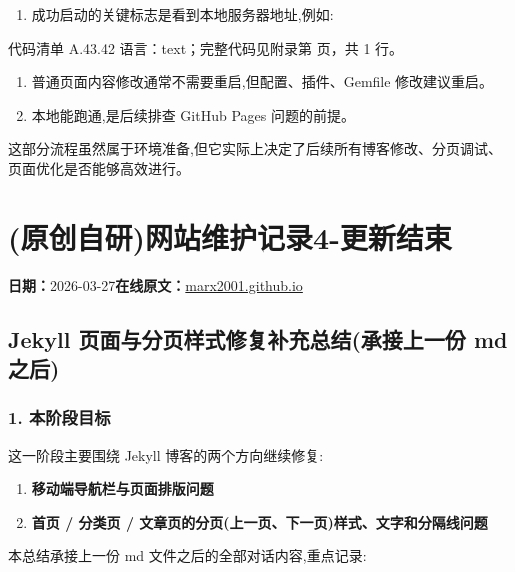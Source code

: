 \documentclass[lang=cn,scheme=chinese,color=blue,device=normal,toc=onecol,math=cm]{elegantbook}
\begin{document}
\begin{enumerate}
\item 成功启动的关键标志是看到本地服务器地址,例如:
\end{enumerate}


\begin{codeindexbox}{代码清单 A.43.42}
语言：text；完整代码见附录第 \pageref{code:43:42} 页，共 1 行。
\end{codeindexbox}


\begin{enumerate}
\item 普通页面内容修改通常不需要重启,但配置、插件、Gemfile 修改建议重启。
\item 本地能跑通,是后续排查 GitHub Pages 问题的前提。
\end{enumerate}


这部分流程虽然属于环境准备,但它实际上决定了后续所有博客修改、分页调试、页面优化是否能够高效进行。\par



\section{(原创自研)网站维护记录4-更新结束}
\begin{articlemeta}
\textbf{日期：}2026-03-27\hfill\textbf{在线原文：}\href{https://marx2001.github.io/sci-note\_posts/20260327deploy/}{marx2001.github.io}
\end{articlemeta}

\subsection{Jekyll 页面与分页样式修复补充总结(承接上一份 md 之后)}


\subsubsection{1. 本阶段目标}


这一阶段主要围绕 Jekyll 博客的两个方向继续修复:\par


\begin{enumerate}
\item \textbf{移动端导航栏与页面排版问题}
\item \textbf{首页 /\allowbreak{} 分类页 /\allowbreak{} 文章页的分页(上一页、下一页)样式、文字和分隔线问题}
\end{enumerate}


本总结承接上一份 md 文件之后的全部对话内容,重点记录:\par
\end{document}
